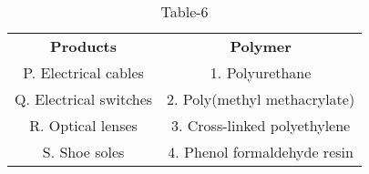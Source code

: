 \begin{table}[htbp]
  \centering
  \caption{Table-6}
  \label{table6}
  \begin{tabular}{cc}
\textbf{Products} & \textbf{Polymer}\\

P. Electrical cables & 1. Polyurethane \\
Q. Electrical switches & 2. Poly(methyl methacrylate) \\
R. Optical lenses & 3. Cross-linked polyethylene \\
S. Shoe soles & 4. Phenol formaldehyde resin \\
  
  
  
  \end{tabular}
\end{table}